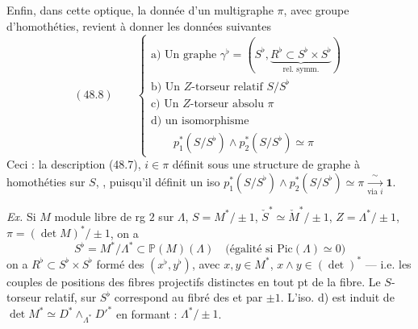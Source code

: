 \documentclass[11pt,a4paper]{article}
\begin{document}
Enfin, dans cette optique, la donnée d'un multigraphe $\pi$, \struck{\ill{}} \struck{$\pi$} avec groupe d'homothéties, revient à donner \ill{} les données suivantes
\[
(48.8) \qquad
\left\{
\begin{array}{l}
\text{a) Un graphe } \gamma^{\flat} = (S^{\flat}, \underbrace{R^{\flat} \subset S^{\flat} \times S^{\flat}}_{\text{rel. symm.}}) \\
\text{b) Un $Z$-torseur relatif } S/S^{\flat} \\
\text{c) Un $Z$-torseur absolu } \pi \\
\text{d) un isomorphisme} \\
\qquad p_1^{*}(S/S^{\flat}) \wedge p_2^{*}(S/S^{\flat}) \simeq \pi
\end{array}
\right.
\]
Ceci : la description (48.7),  $i \in \pi$ définit sous une structure de graphe à homothéties sur $S$, , puisqu'il définit un iso $p_1^{*}(S/S^{\flat}) \wedge p_2^{*}(S/S^{\flat}) \simeq \pi \xrightarrow[\text{via } i]{\ \sim\ } \mathbf{1}$.

\emph{Ex.} Si $M$ module libre de rg $2$ sur $\Lambda$, $S = M^{*}/\pm 1$, $\check{S}^{*} \simeq \check{M}^{*}/\pm 1$, $Z = \Lambda^{*}/\pm 1$, \struck{\ill{}} $\pi = (\det M)^{*}/\pm 1$, on a
\[
S^{\flat} = M^{*}/\Lambda^{*} \subset \mathbb{P}(M)(\Lambda) \quad \text{(égalité si } \mathrm{Pic}(\Lambda) \simeq 0\text{)}
\]
on a $R^{\flat} \subset S^{\flat} \times S^{\flat}$ formé des \struck{\ill{}}  $(x^{\flat}, y^{\flat})$, avec $x, y \in M^{*}$, $x \wedge y \in (\det)^{*}$ --- i.e. les couples de positions des fibres projectifs distinctes en tout pt de la fibre. Le $S$-torseur relatif, sur  $S^{\flat}$ correspond au fibré des  \struck{\ill{}}  et   par $\pm 1$. L'iso. \struck{\ill{}} d) est induit de $\det M^{*} \simeq D^{*} \wedge_{\Lambda^{*}} D'^{*}$ en formant : $\Lambda^{*}/\pm 1$.

\end{document}
